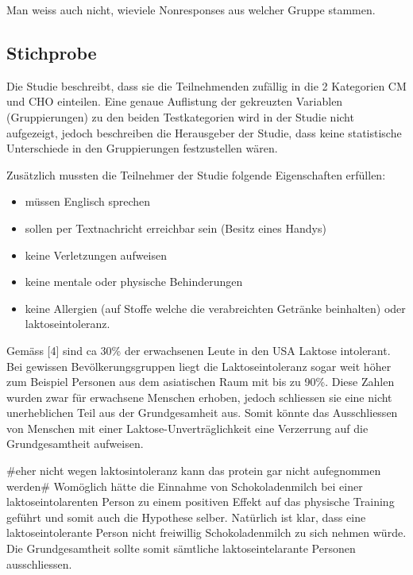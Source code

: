 \documentclass[
]{article}
\providecommand{\tightlist}{%
  \setlength{\itemsep}{0pt}\setlength{\parskip}{0pt}}
\begin{document}
Man weiss auch nicht, wieviele Nonresponses aus welcher Gruppe stammen.

\hypertarget{stichprobe}{%
\subsection{Stichprobe}\label{stichprobe}}

Die Studie beschreibt, dass sie die Teilnehmenden zufällig in die 2
Kategorien CM und CHO einteilen. Eine genaue Auflistung der gekreuzten
Variablen (Gruppierungen) zu den beiden Testkategorien wird in der
Studie nicht aufgezeigt, jedoch beschreiben die Herausgeber der Studie,
dass keine statistische Unterschiede in den Gruppierungen festzustellen
wären.

Zusätzlich mussten die Teilnehmer der Studie folgende Eigenschaften
erfüllen:

\begin{itemize}
\tightlist
\item
  müssen Englisch sprechen
\item
  sollen per Textnachricht erreichbar sein (Besitz eines Handys)
\item
  keine Verletzungen aufweisen
\item
  keine mentale oder physische Behinderungen
\item
  keine Allergien (auf Stoffe welche die verabreichten Getränke
  beinhalten) oder laktoseintoleranz.
\end{itemize}

Gemäss {[}4{]} sind ca 30\% der erwachsenen Leute in den USA Laktose
intolerant. Bei gewissen Bevölkerungsgruppen liegt die Laktoseintoleranz
sogar weit höher zum Beispiel Personen aus dem asiatischen Raum mit bis
zu 90\%. Diese Zahlen wurden zwar für erwachsene Menschen erhoben,
jedoch schliessen sie eine nicht unerheblichen Teil aus der
Grundgesamheit aus. Somit könnte das Ausschliessen von Menschen mit
einer Laktose-Unverträglichkeit eine Verzerrung auf die Grundgesamtheit
aufweisen.

\#eher nicht wegen laktosintoleranz kann das protein gar nicht
aufegnommen werden\# Womöglich hätte die Einnahme von Schokoladenmilch
bei einer laktoseintolarenten Person zu einem positiven Effekt auf das
physische Training geführt und somit auch die Hypothese selber.
Natürlich ist klar, dass eine laktoseintolerante Person nicht freiwillig
Schokoladenmilch zu sich nehmen würde. Die Grundgesamtheit sollte somit
sämtliche laktoseintelarante Personen ausschliessen.
\end{document}
